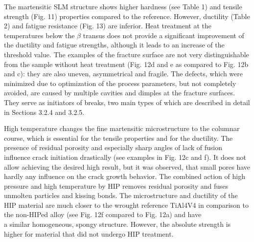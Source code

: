 \documentclass[10pt]{article}
\begin{document}
The martensitic SLM structure shows higher hardness (see Table 1) and tensile strength (Fig. 11) properties compared to the reference. However, ductility (Table 2) and fatigue resistance (Fig. 13) are inferior. Heat treatment at the temperatures below the $\beta$ transus does not provide a significant improvement of the ductility and fatigue strengths, although it leads to an increase of the threshold value. The examples of the fracture surface are not very distinguishable from the sample without heat treatment (Fig. 12d and e as compared to Fig. 12b and c): they are also uneven, asymmetrical and fragile. The defects, which were minimized due to optimization of the process parameters, but not completely avoided, are caused by multiple cavities and dimples at the fracture surfaces. They serve as initiators of breaks, two main types of which are described in detail in Sections 3.2.4 and 3.2.5.

High temperature changes the fine martensitic microstructure to the columnar course, which is essential for the tensile properties and for the ductility. The presence of residual porosity and especially sharp angles of lack of fusion influence crack initiation drastically (see examples in Fig. 12c and f). It does not allow achieving the desired high result, but it was observed, that small pores have hardly any influence on the crack growth behavior. The combined action of high pressure and high temperature by HIP removes residual porosity and fuses unmolten particles and kissing bonds. The microstructure and ductility of the HIP material are much closer to the wrought reference TiAl4V4 in comparison to the non-HIPed alloy (see Fig. 12f compared to Fig. 12a) and have\\
a similar homogeneous, spongy structure. However, the absolute strength is higher for material that did not undergo HIP treatment.
\end{document}
